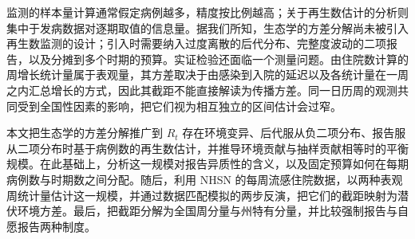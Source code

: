 监测的样本量计算通常假定病例越多，精度按比例越高\citep{cochran1977sampling}；关于再生数估计的分析则集中于发病数据对逐期取值的信息量\citep{parag2022quantifying, bhatt2023semi}。据我们所知，生态学的方差分解尚未被引入再生数监测的设计；引入时需要纳入过度离散的后代分布、完整度波动的二项报告，以及分摊到多个时期的预算。实证检验还面临一个测量问题。由住院数计算的周增长统计量属于表观量，其方差取决于由感染到入院的延迟以及各统计量在一周之内汇总增长的方式，因此其截距不能直接解读为传播方差。同一日历周的观测共同受到全国性因素的影响，把它们视为相互独立的区间估计会过窄\citep{cameron2011robust}。

本文把生态学的方差分解推广到 $R_t$ 存在环境变异、后代服从负二项分布、报告服从二项分布时基于病例数的再生数估计，并推导环境贡献与抽样贡献相等时的平衡规模。在此基础上，分析这一规模对报告异质性的含义，以及固定预算如何在每期病例数与时期数之间分配。随后，利用 NHSN 的每周流感住院数据，以两种表观周统计量估计这一规模，并通过数据匹配模拟的两步反演，把它们的截距映射为潜伏环境方差。最后，把截距分解为全国周分量与州特有分量，并比较强制报告与自愿报告两种制度。
